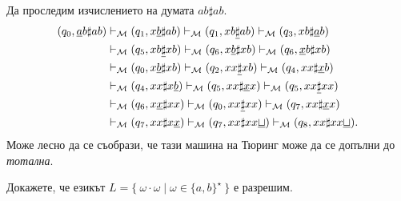 \begin{example}
  Да проследим изчислението на думата $ab\sharp ab$.  
  \begin{align*}
    (q_0, \underline{a}b\sharp ab) & \vdash_{\mathcal{M}} (q_1, x\underline{b}\sharp ab) \vdash_{\mathcal{M}} (q_1,xb\underline{\sharp}ab) \vdash_{\mathcal{M}} (q_3, xb\sharp\underline{a}b)\\
                                   & \vdash_{\mathcal{M}} (q_5, xb\underline{\sharp}xb) \vdash_{\mathcal{M}} (q_6, x\underline{b}\sharp xb) \vdash_{\mathcal{M}} (q_6, \underline{x}b\sharp xb)\\
                                   & \vdash_{\mathcal{M}} (q_0, x\underline{b}\sharp xb) \vdash_{\mathcal{M}} (q_2, xx\underline{\sharp}xb) \vdash_{\mathcal{M}} (q_4, xx\sharp\underline{x}b)\\
                                   & \vdash_{\mathcal{M}} (q_4, xx\sharp x\underline{b}) \vdash_{\mathcal{M}} (q_5, xx\sharp\underline{x}x) \vdash_{\mathcal{M}} (q_5, xx\underline{\sharp} xx)\\
                                   & \vdash_{\mathcal{M}} (q_6, x\underline{x}\sharp xx) \vdash_{\mathcal{M}} (q_0, xx\underline{\sharp} xx) \vdash_{\mathcal{M}} (q_7, xx\sharp\underline{x}x)\\
                                   & \vdash_{\mathcal{M}} (q_7, xx\sharp x\underline{x}) \vdash_{\mathcal{M}} (q_7, xx\sharp xx\underline{\sqcup}) \vdash_{\mathcal{M}} (q_8,xx\sharp xx\underline{\sqcup}).
  \end{align*}
  Може лесно да се съобрази, че тази машина на Тюринг може да се допълни до {\em тотална}.
\end{example}

\begin{problem}
  Докажете, че езикът $L = \{\ \omega \cdot \omega \mid \omega\in\{a,b\}^\star\ \}$ е разрешим.
\end{problem}


